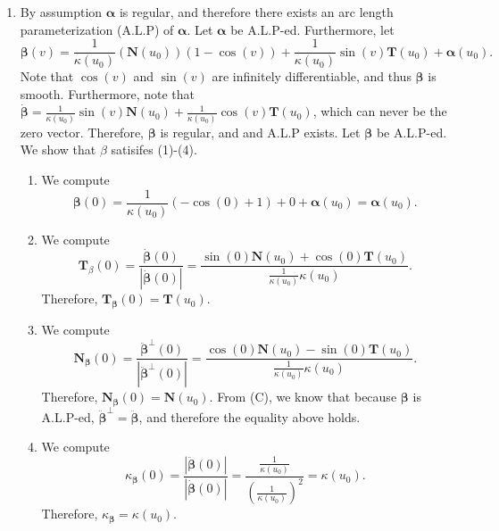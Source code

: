 \documentclass[12pt]{article}
\newcommand{\magnitude}[1]{\left\lvert #1 \right\rvert}
\begin{document}
\begin{enumerate}[label=\Alph*., leftmargin=*]
\begin{proof}
        \end{proof}
      \item By assumption $\bm{\alpha}$ is regular, and therefore there exists an arc length parameterization (A.L.P) of $\bm{\alpha}$. Let $\bm{\alpha}$ be A.L.P-ed. Furthermore, let \begin{equation*} 
        \bm{\beta}(v)=\frac{1}{\kappa(u_0)}(\bm{N}(u_0))(1-\cos(v))+\frac{1}{\kappa(u_0)}\sin(v)\bm{T}(u_0)+\bm{\alpha}(u_0).
      \end{equation*} Note that $\cos(v)$ and $\sin(v)$ are infinitely differentiable, and thus $\bm{\beta}$ is smooth. Furthermore, note that $\bm{\dot{\beta}}=\frac{1}{\kappa(u_0)}\sin(v)\bm{N}(u_0)+\frac{1}{\kappa(u_0)}\cos(v)\bm{T}(u_0)$, which can never be the zero vector.
            Therefore, $\bm{\beta}$ is regular, and and A.L.P exists. Let $\bm{\beta}$ be A.L.P-ed. We show that $\beta$ satisifes (1)-(4).
            \begin{enumerate}[label=(\arabic*)]
              \item We compute\begin{equation*}
                \bm{\beta}(0)=\frac{1}{\kappa(u_0)}(-\cos(0)+1)+0+\bm{\alpha}(u_0)=\bm{\alpha}(u_0).
              \end{equation*}
              \item We compute 
              \begin{equation*}
                \bm{T}_{\beta}(0)=\frac{\bm{\dot{\beta}}(0)}{\magnitude{\bm{\dot{\beta}}(0)}}=\frac{\sin(0)\bm{N}(u_0)+\cos(0)\bm{T}(u_0)}{\frac{1}{\kappa(u_0)}\kappa(u_0)}.
              \end{equation*} Therefore, $\bm{T}_{\bm{\beta}}(0)=\bm{T}(u_0)$.
              \item We compute \begin{equation*}
                \bm{N}_{\bm{\beta}}(0)=\frac{\bm{\ddot{\beta}}^{\perp}(0)}{\magnitude{\bm{\ddot{\beta}}^{\perp}(0)}}=\frac{\cos(0)\bm{N}(u_0)-\sin(0)\bm{T}(u_0)}{\frac{1}{\kappa(u_0)}\kappa(u_0)}.
              \end{equation*} Therefore, $\bm{N}_{\bm{\beta}}(0)=\bm{N}(u_0)$. From (C), we know that because $\bm{\beta}$ is A.L.P-ed, $\bm{\ddot{\beta}}^{\perp}=\bm{\ddot{\beta}}$, and therefore the equality above holds.
              \item We compute\begin{equation*}
                  \kappa_{\bm{\beta}}(0)=\frac{\magnitude{\bm{\ddot{\beta}}(0)}}{\magnitude{\bm{\dot{\beta}}(0)}}=\frac{\frac{1}{\kappa(u_0)}}{(\frac{1}{\kappa(u_0)})^2}=\kappa(u_0).
              \end{equation*}
              Therefore, $\kappa_{\bm{\beta}}=\kappa(u_0)$.
            \end{enumerate}
    \end{enumerate}
\end{document}

